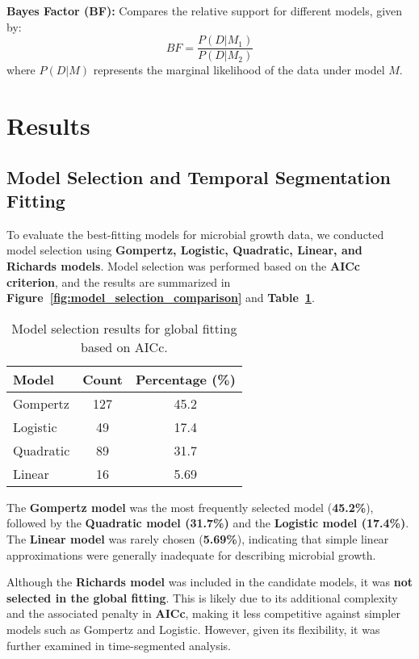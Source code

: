\documentclass{article}
\begin{document}
\textbf{Bayes Factor (BF):} Compares the relative support for different models, given by:
\begin{equation}
  BF = \frac{P(D | M_1)}{P(D | M_2)}
\end{equation}
where \( P(D | M) \) represents the marginal likelihood of the data under model \( M \).


\section{Results}
\subsection{Model Selection and Temporal Segmentation Fitting}

To evaluate the best-fitting models for microbial growth data, we conducted model selection using \textbf{Gompertz, Logistic, Quadratic, Linear, and Richards models}. Model selection was performed based on the \textbf{AICc criterion}, and the results are summarized in \textbf{Figure~\ref{fig:model_selection_comparison}} and \textbf{Table~\ref{tab:global_fit}}.

\begin{table}[h]
    \centering
    \caption{Model selection results for global fitting based on AICc.}
    \label{tab:global_fit}
    \begin{tabular}{lcc}
        \hline
        \textbf{Model} & \textbf{Count} & \textbf{Percentage (\%)} \\
        \hline
        Gompertz  & 127  & 45.2  \\
        Logistic  & 49   & 17.4  \\
        Quadratic & 89   & 31.7  \\
        Linear    & 16   & 5.69  \\
        \hline
    \end{tabular}
\end{table}

The \textbf{Gompertz model} was the most frequently selected model (\textbf{45.2\%}), followed by the \textbf{Quadratic model (31.7\%)} and the \textbf{Logistic model (17.4\%)}. The \textbf{Linear model} was rarely chosen (\textbf{5.69\%}), indicating that simple linear approximations were generally inadequate for describing microbial growth.

Although the \textbf{Richards model} was included in the candidate models, it was \textbf{not selected in the global fitting}. This is likely due to its additional complexity and the associated penalty in \textbf{AICc}, making it less competitive against simpler models such as Gompertz and Logistic. However, given its flexibility, it was further examined in time-segmented analysis.
\end{document}

